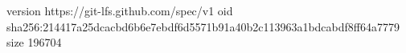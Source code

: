 version https://git-lfs.github.com/spec/v1
oid sha256:214417a25dcacbd6b6e7ebdf6d5571b91a40b2c113963a1bdcabdf8ff64a7779
size 196704
